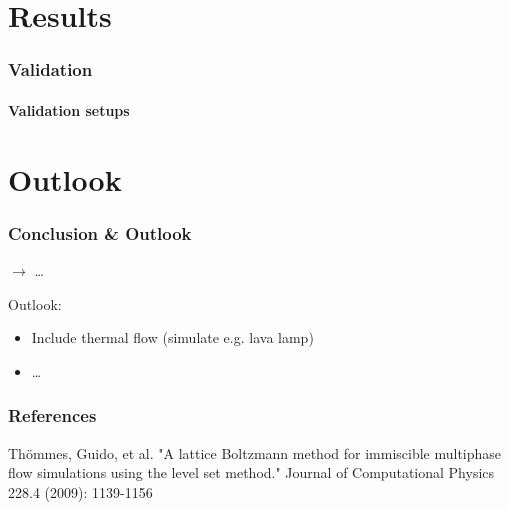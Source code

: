 \documentclass[ucs]{beamer}
\begin{document}
\section{Results}
\begin{frame}
\frametitle{Validation}
\framesubtitle{Validation setups}
\end{frame}

\section{Outlook}
\begin{frame}
\frametitle{Conclusion \& Outlook}
$\rightarrow$ \dots

\vspace{.8cm}
Outlook:
\begin{itemize}
\item<1-> Include thermal flow (simulate e.g. lava lamp)
\item<2-> \dots
\end{itemize}

\end{frame}

\begin{frame}
\frametitle{References}
\begin{thebibliography}{etw}
     Thömmes, Guido, et al. "A lattice Boltzmann method for immiscible multiphase flow simulations using the level set method." Journal of Computational Physics 228.4 (2009): 1139-1156
\end{thebibliography}
\end{frame}
\end{document}

